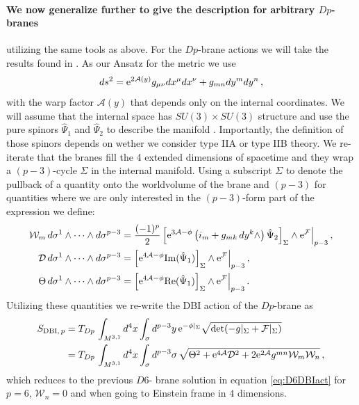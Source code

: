 \documentclass[12pt]{report}
\newcommand{\be}{\begin{equation}}
\newcommand{\ee}{\end{equation}}
\newcommand{\bea}{\begin{equation}\begin{aligned}}
\newcommand{\eea}{\end{aligned}\end{equation}}
\def\rme{{\rm e}}
\def\rmre{{\rm Re}}
\def\rmim{{\rm Im}}
\begin{document}
\paragraph{We now generalize further to give the description for arbitrary $Dp$-branes} utilizing the same tools as above. For the $Dp$-brane actions we will take the results found in \cite{Martucci:2005ht,Martucci:2006ij}. As our Ansatz for the metric we use
\be 
ds^2 = \rme^{2\mathcal{A}(y)} g_{\mu \nu} dx^\mu dx^\nu + g_{mn} dy^m dy^n \,,
\ee
with the warp factor $\mathcal{A}(y)$ that depends only on the internal coordinates. We will assume that the internal space has $SU(3)\times SU(3)$ structure and use the pure spinors $\hat{\Psi}_1$ and $\hat{\Psi}_2$ to describe the manifold \cite{Martucci:2005ht}. Importantly, the definition of those spinors depends on wether we consider type IIA or type IIB theory. We re-iterate that the branes fill the 4 extended dimensions of spacetime and they wrap a $(p-3)$-cycle $\Sigma$ in the internal manifold. Using a subscript $\Sigma$ to denote the pullback of a quantity onto the worldvolume of the brane and $(p-3)$ for quantities where we are only interested in the $(p-3)$-form part of the expression we define:
\bea 
\mathcal{W}_m \, d\sigma^1 \wedge \cdots \wedge d\sigma^{p-3} &= \frac{(-1)^p}{2} \left[\rme^{3\mathcal{A}-\phi} \left( i_m + g_{mk}\,dy^k \wedge \right) \hat{\Psi}_2 \right]_\Sigma \wedge \rme^{\mathcal{F}}\Big|_{p-3}\,,\\
\mathcal{D} \, d\sigma^1 \wedge \cdots \wedge d\sigma^{p-3} &= \left[\rme^{4\mathcal{A}-\phi} \rmim(\hat{\Psi}_1)\right]_\Sigma \wedge \rme^{\mathcal{F}}\Big|_{p-3}\,,\\
\Theta \, d\sigma^1 \wedge \cdots \wedge d\sigma^{p-3} &= \left[\rme^{4\mathcal{A}-\phi} \rmre(\hat{\Psi}_1)\right]_\Sigma \wedge \rme^{\mathcal{F}}\Big|_{p-3}\,.
\eea 
Utilizing these quantities we re-write the DBI action of the $Dp$-brane as
\bea
S_{\text{DBI},\,p} &= T_{Dp} \, \int_{M^{3,1}} d^4x \int_\sigma d^{p-3}y \, \rme^{-\phi|_\Sigma} \sqrt{\det(-g|_\Sigma + \mathcal{F}|_\Sigma)}\\
&= T_{Dp} \, \int_{M^{3,1}} d^4x \int_\sigma d^{p-3}\sigma \, \sqrt{\Theta^2 + \rme^{4\mathcal{A}} \mathcal{D}^2 + 2 \rme^{2\mathcal{A}} g^{mn} \mathcal{W}_m \mathcal{W}_n}\,,
\eea
which reduces to the previous $D6$- brane solution in equation \eqref{eq:D6DBIact} for $p=6$, $\mathcal{W}_n = 0$ and when going to Einstein frame in $4$ dimensions.\\
\end{document}
